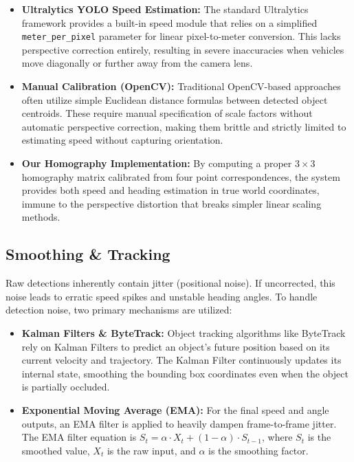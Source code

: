 \begin{itemize}
  \item \textbf{Ultralytics YOLO Speed Estimation:} The standard Ultralytics framework provides a built-in speed module that relies on a simplified \texttt{meter\_per\_pixel} parameter for linear pixel-to-meter conversion. This lacks perspective correction entirely, resulting in severe inaccuracies when vehicles move diagonally or further away from the camera lens.
  \item \textbf{Manual Calibration (OpenCV):} Traditional OpenCV-based approaches often utilize simple Euclidean distance formulas between detected object centroids. These require manual specification of scale factors without automatic perspective correction, making them brittle and strictly limited to estimating speed without capturing orientation.
  \item \textbf{Our Homography Implementation:} By computing a proper $3 \times 3$ homography matrix calibrated from four point correspondences, the system provides both speed and heading estimation in true world coordinates, immune to the perspective distortion that breaks simpler linear scaling methods.
\end{itemize}

\subsection{Smoothing \& Tracking}
Raw detections inherently contain jitter (positional noise). If uncorrected, this noise leads to erratic speed spikes and unstable heading angles. To handle detection noise, two primary mechanisms are utilized:

\begin{itemize}
    \item \textbf{Kalman Filters \& ByteTrack:} Object tracking algorithms like ByteTrack rely on Kalman Filters to predict an object's future position based on its current velocity and trajectory. The Kalman Filter continuously updates its internal state, smoothing the bounding box coordinates even when the object is partially occluded.
    \item \textbf{Exponential Moving Average (EMA):} For the final speed and angle outputs, an EMA filter is applied to heavily dampen frame-to-frame jitter. The EMA filter equation is $S_t = \alpha \cdot X_t + (1 - \alpha) \cdot S_{t-1}$, where $S_t$ is the smoothed value, $X_t$ is the raw input, and $\alpha$ is the smoothing factor.
\end{itemize}

